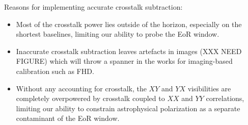 \documentclass[10pt,a4paper,notitlepage]{article}
\begin{document}
Reasons for implementing accurate crosstalk subtraction:
\begin{itemize}
\item Most of the crosstalk power lies outside of the horizon, especially on the shortest baselines, limiting our ability to probe the EoR window.
\item Inaccurate crosstalk subtraction leaves artefacts in images (XXX NEED FIGURE) which will throw a spanner in the works for imaging-based calibration such as FHD.
\item Without any accounting for crosstalk, the $XY$ and $YX$ visibilities are completely overpowered by crosstalk coupled to $XX$ and $YY$ correlations, limiting our ability to constrain astrophysical polarization as a separate contaminant of the EoR window.
\end{itemize}



\end{document}

